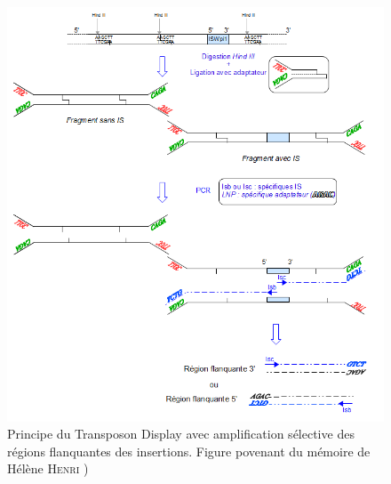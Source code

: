 \begin{figure}[h!]
	\begin{center}
		\includegraphics[width=160mm]{tdisplay.png}
	\end{center}
	\caption{Principe du Transposon Display avec amplification sélective des régions
flanquantes des insertions. Figure povenant du mémoire de Hélène \textsc{Henri}\cite{memHH}%
	)}
	\label{fig:figure1}
\end{figure}

